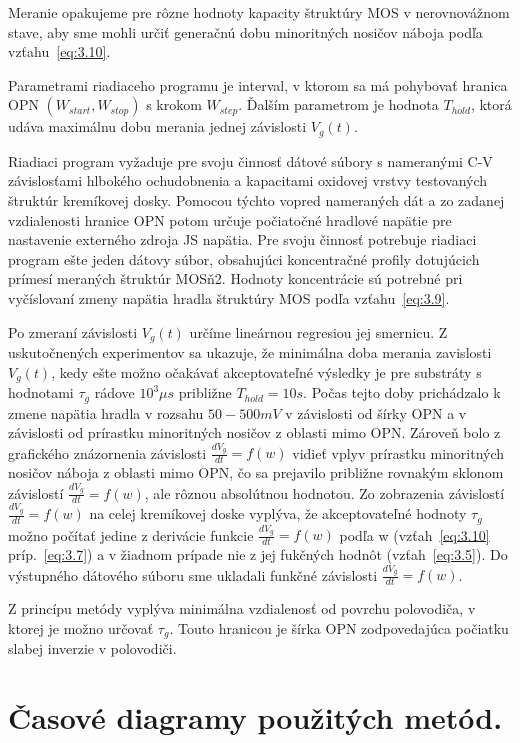 Meranie opakujeme pre rôzne hodnoty kapacity štruktúry MOS v
nerovnovážnom stave, aby sme mohli určiť generačnú dobu minoritných
nosičov náboja podľa vzťahu~\ref{eq:3.10}.

Parametrami riadiaceho programu je interval, v ktorom sa má pohybovať
hranica OPN $(W_{start}, W_{stop})$ s krokom $W_{step}$. Ďalším
parametrom je hodnota $T_{hold}$, ktorá udáva maximálnu dobu merania
jednej závislosti $V_{g}(t)$.

Riadiaci program vyžaduje pre svoju činnosť dátové súbory s nameranými
C-V závislosťami hlbokého ochudobnenia a kapacitami oxidovej vrstvy
testovaných štruktúr kremíkovej dosky. Pomocou týchto vopred
nameraných dát a zo zadanej vzdialenosti hranice OPN potom určuje
počiatočné hradlové napätie pre nastavenie externého zdroja JS
napätia.  Pre svoju činnosť potrebuje riadiaci program ešte jeden
dátovy súbor, obsahujúci koncentračné profily dotujúcich prímesí
meraných štruktúr MOSň2. Hodnoty koncentrácie sú potrebné pri
vyčíslovaní zmeny napätia hradla štruktúry MOS podľa
vzťahu~\ref{eq:3.9}.

Po zmeraní závislosti $V_{g}(t)$ určíme lineárnou regresiou jej
smernicu. Z uskutočnených experimentov sa ukazuje, že minimálna doba
merania zavislosti $V_{g}(t)$, kedy ešte možno očakávať akceptovateľné
výsledky je pre substráty s hodnotami $\tau_g$ rádove $10^{3}\mu{s}$
približne $T_{hold}=10s$. Počas tejto doby prichádzalo k zmene napätia
hradla v rozsahu $50-500 mV$ v závislosti od šírky OPN a v závislosti
od prírastku minoritných nosičov z oblasti mimo OPN\@. Zároveň bolo z
grafického znázornenia závislosti $\frac{dV_g}{dt}=f(w)$ vidieť vplyv
prírastku minoritných nosičov náboja z oblasti mimo OPN, čo sa
prejavilo približne rovnakým sklonom závislostí
$\frac{dV_g}{dt}=f(w)$, ale rôznou absolútnou hodnotou. Zo zobrazenia
závislostí $\frac{dV_g}{dt}=f(w)$ na celej kremíkovej doske vyplýva,
že akceptovateľné hodnoty $\tau_{g}$ možno počítať jedine z derivácie
funkcie $\frac{dV_g}{dt}=f(w)$ podľa w (vzťah~\ref{eq:3.10}
príp.~\ref{eq:3.7}) a v žiadnom prípade nie z jej fukčných hodnôt
(vzťah~\ref{eq:3.5}). Do výstupného dátového súboru sme ukladali
funkčné závislosti $\frac{dV_g}{dt}=f(w)$.

Z princípu metódy vyplýva minimálna vzdialenosť od povrchu polovodiča,
v ktorej je možno určovať $\tau_{g}$. Touto hranicou je šírka OPN
zodpovedajúca počiatku slabej inverzie v polovodiči.

\section{Časové diagramy použitých metód.}\label{sec:5.4}

